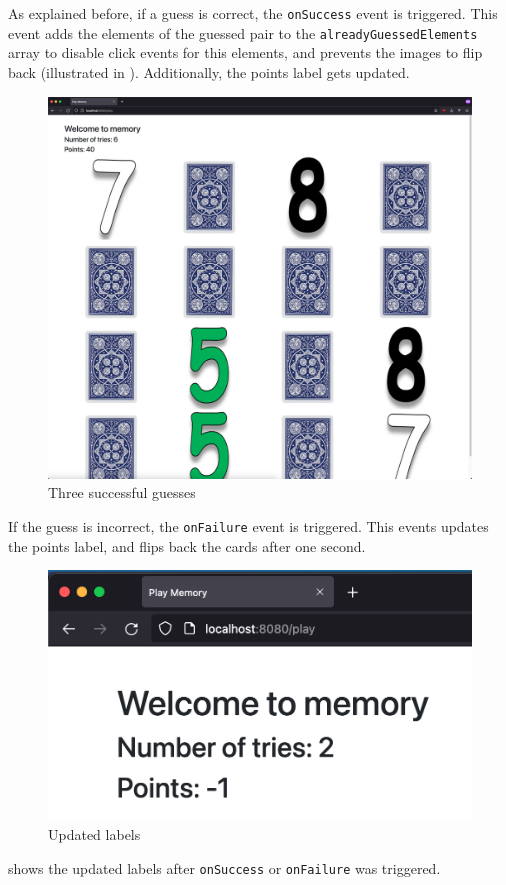 As explained before, if a guess is correct, the \texttt{onSuccess} event is triggered. This event adds the elements of the guessed pair to the \texttt{alreadyGuessedElements} array to disable click events for this elements, and prevents the images to flip back (illustrated in ). Additionally, the points label gets updated.
\begin{figure}[h]
\centering
\includegraphics[scale=0.1]{images/03_impl/frontend/flipped-cards}
\caption{Three successful guesses}
\label{fig:03_impl_frontend_memGame_flippedCards}
\end{figure}
If the guess is incorrect, the \texttt{onFailure} event is triggered. This events updates the points label, and flips back the cards after one second.
\begin{figure}[h]
\centering
\includegraphics[scale=0.3]{images/03_impl/frontend/updated-labels}
\caption{Updated labels}
\label{fig:03_impl_frontend_memGame_updateLabels}
\end{figure}
 shows the updated labels after \texttt{onSuccess} or \texttt{onFailure} was triggered.

